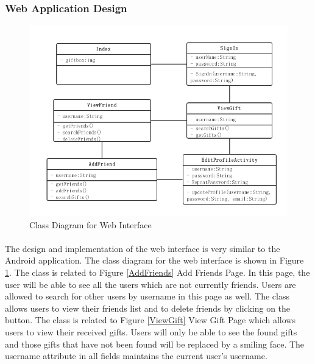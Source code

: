 \subsubsection{Web Application Design}
\begin{figure}[htb]
\centering
\includegraphics[width=1\textwidth]{section03/assets/WebClassDiagram.png}
\caption[Class Diagram for Web Interface]{\label{WebClassDiagram}Class Diagram for Web Interface}
\end{figure}
\paragraph{} The design and implementation of the web interface is very similar to the Android application. The class diagram for the web interface is shown in Figure \ref{WebClassDiagram}. The  class is related to Figure \ref{AddFriends} Add Friends Page. In this page, the user will be able to see all the users which are not currently friends. Users are allowed to search for other users by username in this page as well. The  class allows users to view their friends list and to delete friends by clicking on the  button. The  class is related to Figure \ref{ViewGift} View Gift Page which allows users to view their received gifts. Users will only be able to see the found gifts and those gifts that have not been found will be replaced by a smiling face. The username attribute in all fields maintains the current user's username. 
